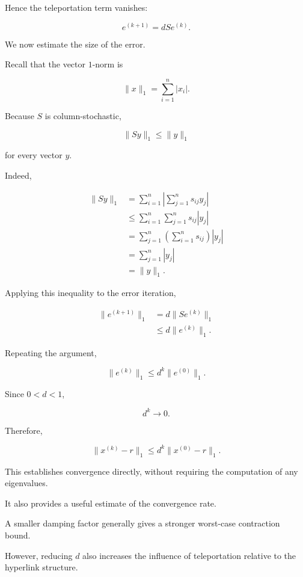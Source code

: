 \documentclass[11pt,a4paper]{article}
\theoremstyle{definition}
\theoremstyle{remark}
\begin{document}
Hence the teleportation
term vanishes:

\begin{equation}
\boxed{
e^{(k+1)}=dSe^{(k)}.
}
\label{eq:pagerank_error_iteration}
\end{equation}

We now estimate the
size of the error.

Recall that the
vector $1$-norm is

\[
\|x\|_1
=
\sum_{i=1}^{n}|x_i|.
\]

Because $S$ is
column-stochastic,

\[
\|Sy\|_1\leq\|y\|_1
\]

for every vector $y$.

Indeed,

\[
\begin{aligned}
\|Sy\|_1
&=
\sum_{i=1}^{n}
\left|
\sum_{j=1}^{n}s_{ij}y_j
\right|\\
&\leq
\sum_{i=1}^{n}
\sum_{j=1}^{n}s_{ij}|y_j|\\
&=
\sum_{j=1}^{n}
\left(
\sum_{i=1}^{n}s_{ij}
\right)|y_j|\\
&=
\sum_{j=1}^{n}|y_j|\\
&=\|y\|_1.
\end{aligned}
\]

Applying this inequality
to the error iteration,

\[
\begin{aligned}
\|e^{(k+1)}\|_1
&=
d\|Se^{(k)}\|_1\\
&\leq
d\|e^{(k)}\|_1.
\end{aligned}
\]

Repeating the argument,

\[
\|e^{(k)}\|_1
\leq
d^k\|e^{(0)}\|_1.
\]

Since $0<d<1$,

\[
d^k\longrightarrow0.
\]

Therefore,

\begin{equation}
\boxed{
\|x^{(k)}-r\|_1
\leq
d^k\|x^{(0)}-r\|_1.
}
\label{eq:pagerank_convergence_bound}
\end{equation}

This establishes convergence
directly, without requiring
the computation of
any eigenvalues.

It also provides a
useful estimate of
the convergence rate.

A smaller damping factor
generally gives a stronger
worst-case contraction bound.

However, reducing $d$
also increases the influence
of teleportation relative
to the hyperlink structure.
\end{document}
